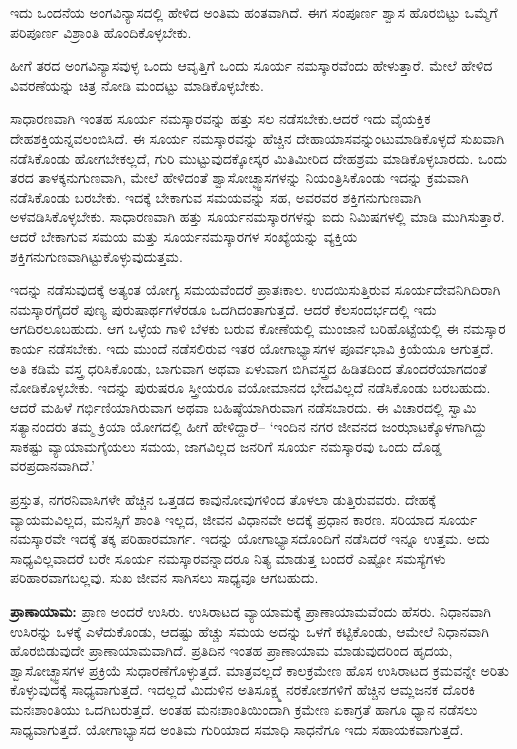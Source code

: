  ಇದು ಒಂದನೆಯ ಅಂಗವಿನ್ಯಾಸದಲ್ಲಿ ಹೇಳಿದ ಅಂತಿಮ ಹಂತವಾಗಿದೆ. ಈಗ ಸಂಪೂರ್ಣ ಶ್ವಾಸ ಹೊರಬಿಟ್ಟು ಒಮ್ಮೆಗೆ ಪರಿಪೂರ್ಣ ವಿಶ್ರಾಂತಿ ಹೊಂದಿಕೊಳ್ಳಬೇಕು.

ಹೀಗೆ  ತರದ ಅಂಗವಿನ್ಯಾಸವುಳ್ಳ ಒಂದು ಆವೃತ್ತಿಗೆ ಒಂದು ಸೂರ್ಯ ನಮಸ್ಕಾರವೆಂದು ಹೇಳುತ್ತಾರೆ. ಮೇಲೆ ಹೇಳಿದ ವಿವರಣೆಯನ್ನು ಚಿತ್ರ ನೋಡಿ ಮಂದಟ್ಟು ಮಾಡಿಕೊಳ್ಳಬೇಕು.

ಸಾಧಾರಣವಾಗಿ ಇಂತಹ ಸೂರ್ಯ ನಮಸ್ಕಾರವನ್ನು ಹತ್ತು ಸಲ ನಡೆಸಬೇಕು.ಆದರೆ ಇದು ವೈಯಕ್ತಿಕ ದೇಹಶಕ್ತಿಯನ್ನವಲಂಬಿಸಿದೆ. ಈ ಸೂರ್ಯ ನಮಸ್ಕಾರವನ್ನು ಹೆಚ್ಚಿನ ದೇಹಾಯಾಸವನ್ನುಂಟುಮಾಡಿಕೊಳ್ಳದೆ ಸುಖವಾಗಿ ನಡೆಸಿಕೊಂಡು ಹೋಗಬೇಕಲ್ಲದೆ, ಗುರಿ ಮುಟ್ಟುವುದಕ್ಕೋಸ್ಕರ ಮಿತಿಮೀರಿದ ದೇಹಶ್ರಮ ಮಾಡಿಕೊಳ್ಳಬಾರದು. ಒಂದು ತರದ ತಾಳಕ್ಕನುಗುಣವಾಗಿ, ಮೇಲೆ ಹೇಳಿದಂತೆ ಶ್ವಾಸೋಚ್ಛ್ವಾಸಗಳನ್ನು ನಿಯಂತ್ರಿಸಿಕೊಂಡು ಇದನ್ನು ಕ್ರಮವಾಗಿ ನಡೆಸಿಕೊಂಡು ಬರಬೇಕು. ಇದಕ್ಕೆ ಬೇಕಾಗುವ ಸಮಯವನ್ನು ಸಹ, ಅವರವರ ಶಕ್ತಿಗನುಗುಣವಾಗಿ ಅಳವಡಿಸಿಕೊಳ್ಳಬೇಕು. ಸಾಧಾರಣವಾಗಿ ಹತ್ತು ಸೂರ್ಯನಮಸ್ಕಾರಗಳನ್ನು ಐದು ನಿಮಿಷಗಳಲ್ಲಿ ಮಾಡಿ ಮುಗಿಸುತ್ತಾರೆ. ಆದರೆ ಬೇಕಾಗುವ ಸಮಯ ಮತ್ತು ಸೂರ್ಯನಮಸ್ಕಾರಗಳ ಸಂಖ್ಯೆಯನ್ನು ವ್ಯಕ್ತಿಯ ಶಕ್ತಿಗನುಗುಣವಾಗಿಟ್ಟುಕೊಳ್ಳುವುದುತ್ತಮ.

ಇದನ್ನು ನಡೆಸುವುದಕ್ಕೆ ಅತ್ಯಂತ ಯೋಗ್ಯ ಸಮಯವೆಂದರೆ ಪ್ರಾತಃಕಾಲ. ಉದಯಿಸುತ್ತಿರುವ ಸೂರ್ಯದೇವನಿಗಿದಿರಾಗಿ ನಮಸ್ಕಾರಗೈದರೆ ಪುಣ್ಯ ಪುರುಷಾರ್ಥಗಳೆರಡೂ ಒದಗಿದಂತಾಗುತ್ತದೆ. ಆದರೆ ಕೆಲಸಂದರ್ಭದಲ್ಲಿ ಇದು ಆಗದಿರಲೂಬಹುದು. ಆಗ ಒಳ್ಳೆಯ ಗಾಳಿ ಬೆಳಕು ಬರುವ ಕೋಣೆಯಲ್ಲಿ ಮುಂಜಾನೆ ಬರಿಹೊಟ್ಟೆಯಲ್ಲಿ ಈ ನಮಸ್ಕಾರ ಕಾರ್ಯ ನಡೆಸಬೇಕು. ಇದು ಮುಂದೆ ನಡೆಸಲಿರುವ ಇತರ ಯೋಗಾಭ್ಯಾಸಗಳ ಪೂರ್ವಭಾವಿ ಕ್ರಿಯೆಯೂ ಆಗುತ್ತದೆ. ಅತಿ ಕಡಿಮೆ ವಸ್ತ್ರ ಧರಿಸಿಕೊಂಡು, ಬಾಗುವಾಗ ಅಥವಾ ಏಳುವಾಗ ಬಿಗಿವಸ್ತ್ರದ ಹಿಡಿತದಿಂದ ತೊಂದರೆಯಾಗದಂತೆ ನೋಡಿಕೊಳ್ಳಬೇಕು. ಇದನ್ನು ಪುರುಷರೂ ಸ್ತ್ರೀಯರೂ ವಯೋಮಾನದ ಭೇದವಿಲ್ಲದೆ ನಡೆಸಿಕೊಂಡು ಬರಬಹುದು. ಆದರೆ ಮಹಿಳೆ ಗರ್ಭಿಣಿಯಾಗಿರುವಾಗ ಅಥವಾ ಬಹಿಷ್ಠೆಯಾಗಿರುವಾಗ ನಡೆಸಬಾರದು. ಈ ವಿಚಾರದಲ್ಲಿ ಸ್ವಾಮಿ ಸತ್ಯಾನಂದರು ತಮ್ಮ ಕ್ರಿಯಾ ಯೋಗದಲ್ಲಿ ಹೀಗೆ ಹೇಳಿದ್ದಾರೆ– `ಇಂದಿನ ನಗರ ಜೀವನದ ಜಂಝಾಟಕ್ಕೊಳಗಾಗಿದ್ದು ಸಾಕಷ್ಟು ವ್ಯಾಯಾಮಗೈಯಲು ಸಮಯ, ಜಾಗವಿಲ್ಲದ ಜನರಿಗೆ ಸೂರ್ಯ ನಮಸ್ಕಾರವು ಒಂದು ದೊಡ್ಡ ವರಪ್ರದಾನವಾಗಿದೆ.'

ಪ್ರಸ್ತುತ, ನಗರನಿವಾಸಿಗಳೇ ಹೆಚ್ಚಿನ ಒತ್ತಡದ ಕಾವುನೋವುಗಳಿಂದ ತೊಳಲಾ ಡುತ್ತಿರುವವರು. ದೇಹಕ್ಕೆ ವ್ಯಾಯಮವಿಲ್ಲದ, ಮನಸ್ಸಿಗೆ ಶಾಂತಿ ಇಲ್ಲದ, ಜೀವನ ವಿಧಾನವೇ ಅದಕ್ಕೆ ಪ್ರಧಾನ ಕಾರಣ. ಸರಿಯಾದ ಸೂರ್ಯ ನಮಸ್ಕಾರವೇ ಇದಕ್ಕೆ ತಕ್ಕ ಪರಿಹಾರಮಾರ್ಗ. ಇದನ್ನು ಯೋಗಾಭ್ಯಾಸದೊಂದಿಗೆ ನಡೆಸಿದರೆ ಇನ್ನೂ ಉತ್ತಮ. ಅದು ಸಾಧ್ಯವಿಲ್ಲವಾದರೆ ಬರೇ ಸೂರ್ಯ ನಮಸ್ಕಾರವನ್ನಾದರೂ ನಿತ್ಯ ಮಾಡುತ್ತ ಬಂದರೆ ಎಷ್ಟೋ ಸಮಸ್ಯೆಗಳು ಪರಿಹಾರವಾಗಬಲ್ಲವು. ಸುಖ ಜೀವನ ಸಾಗಿಸಲು ಸಾಧ್ಯವೂ ಆಗಬಹುದು.

\textbf{ಪ್ರಾಣಾಯಾಮ:} ಪ್ರಾಣ ಅಂದರೆ ಉಸಿರು. ಉಸಿರಾಟದ ವ್ಯಾಯಾಮಕ್ಕೆ ಪ್ರಾಣಾಯಾಮವೆಂದು ಹೆಸರು. ನಿಧಾನವಾಗಿ ಉಸಿರನ್ನು ಒಳಕ್ಕೆ ಎಳೆದುಕೊಂಡು, ಆದಷ್ಟು ಹೆಚ್ಚು ಸಮಯ ಅದನ್ನು ಒಳಗೆ ಕಟ್ಟಿಕೊಂಡು, ಆಮೇಲೆ ನಿಧಾನವಾಗಿ ಹೊರಬಿಡುವುದೇ ಪ್ರಾಣಾಯಾಮವಾಗಿದೆ. ಪ್ರತಿದಿನ ಇಂತಹ ಪ್ರಾಣಾಯಾಮ ಮಾಡುವುದರಿಂದ ಹೃದಯ, ಶ್ವಾಸೋಚ್ಛ್ವಾಸಗಳ ಪ್ರಕ್ರಿಯೆ ಸುಧಾರಣೆಗೊಳ್ಳುತ್ತದೆ. ಮಾತ್ರವಲ್ಲದೆ ಕಾಲಕ್ರಮೇಣ ಹೊಸ ಉಸಿರಾಟದ ಕ್ರಮವನ್ನೇ ಅರಿತು ಕೊಳ್ಳುವುದಕ್ಕೆ ಸಾಧ್ಯವಾಗುತ್ತದೆ. ಇದಲ್ಲದೆ ಮಿದುಳಿನ ಅತಿಸೂಕ್ಷ್ಮ ನರಕೋಶಗಳಿಗೆ ಹೆಚ್ಚಿನ ಆಮ್ಲಜನಕ ದೊರಕಿ ಮನಃಶಾಂತಿಯು ಒದಗಿಬರುತ್ತದೆ. ಅಂತಹ ಮನಃಶಾಂತಿಯಿಂದಾಗಿ ಕ್ರಮೇಣ ಏಕಾಗ್ರತೆ ಹಾಗೂ ಧ್ಯಾನ ನಡೆಸಲು ಸಾಧ್ಯವಾಗುತ್ತದೆ. ಯೋಗಾಭ್ಯಾಸದ ಅಂತಿಮ ಗುರಿಯಾದ ಸಮಾಧಿ ಸಾಧನೆಗೂ ಇದು ಸಹಾಯಕವಾಗುತ್ತದೆ.

